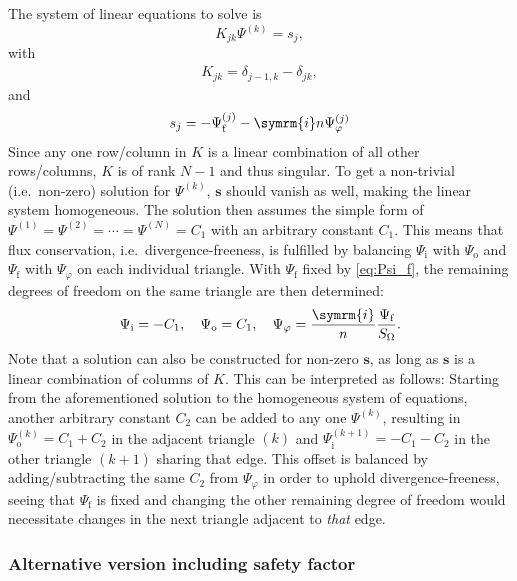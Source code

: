 \documentclass[a4paper, 10pt, english]{article}
\let\temp\varrho
\let\varrho\rho
\let\rho\temp
\let\temp\vartheta
\let\vartheta\theta
\let\theta\temp
\let\temp\varphi
\let\varphi\phi
\let\phi\temp
\let\vec\symbf
\newcommand*\im{\ensuremath{\symrm{i}}}  %
\newcommand*\fs{\ensuremath{\textrm{f}}}  %
\newcommand*\inw{\ensuremath{\textrm{i}}}  %
\newcommand*\out{\ensuremath{\textrm{o}}}  %
\begin{document}
The system of linear equations to solve is
\begin{equation}
  K_{jk} \Psi^{(k)} = s_{j},
\end{equation}
with
\begin{gather}
  K_{jk} = \delta_{j-1, k} - \delta_{jk},
\end{gather}
and
\begin{gather}
  s_{j} = -\Psi_{\fs}^{(j)} - \im n \Psi_{\phi}^{(j)}
\end{gather}
Since any one row/column in $K$ is a linear combination of all other rows/columns, $K$ is of rank $N - 1$ and thus singular. To get a non-trivial (i.e.\ non-zero) solution for $\Psi^{(k)}$, $\vec{s}$ should vanish as well, making the linear system homogeneous. The solution then assumes the simple form of $\Psi^{(1)} = \Psi^{(2)} = \dotsb = \Psi^{(N)} = C_{1}$ with an arbitrary constant $C_{1}$. This means that flux conservation, i.e.\ divergence-freeness, is fulfilled by balancing $\Psi_{\inw}$ with $\Psi_{\out}$ and $\Psi_{\fs}$ with $\Psi_{\phi}$ on each individual triangle. With $\Psi_{\fs}$ fixed by \cref{eq:Psi_f}, the remaining degrees of freedom on the same triangle are then determined:
\begin{gather}
  \Psi_{\inw} = -C_{1}, \quad \Psi_{\out} = C_{1}, \quad \Psi_{\phi} = \frac{\im}{n} \frac{\Psi_{\fs}}{S_{\Omega}}.
\end{gather}
Note that a solution can also be constructed for non-zero $\vec{s}$, as long as $\vec{s}$ is a linear combination of columns of $K$. This can be interpreted as follows: Starting from the aforementioned solution to the homogeneous system of equations, another arbitrary constant $C_{2}$ can be added to any one $\Psi^{(k)}$, resulting in $\Psi_{\out}^{(k)} = C_{1} + C_{2}$ in the adjacent triangle $(k)$ and $\Psi_{\inw}^{(k+1)} = -C_{1} - C_{2}$  in the other triangle $(k+1)$ sharing that edge. This offset is balanced by adding/subtracting the same $C_{2}$ from $\Psi_{\phi}$ in order to uphold divergence-freeness, seeing that $\Psi_{\fs}$ is fixed and changing the other remaining degree of freedom would necessitate changes in the next triangle adjacent to \emph{that} edge.

\subsubsection{Alternative version including safety factor}
\end{document}
